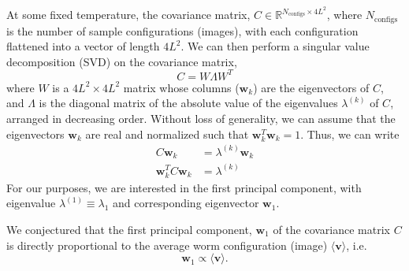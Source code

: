 \documentclass[../main.tex]{subfiles}
\begin{document}
At some fixed temperature, the covariance matrix, $C \in \mathbb{R}^{N_{\mathrm{configs}}\times4L^2}$, where
$N_{\mathrm{configs}}$ is the number of sample configurations (images), with each configuration flattened into a vector
of length $4L^2$. We can then perform a singular value decomposition (SVD) on the covariance matrix,
\begin{equation}
    C = W\Lambda W^{T}
    \label{svd}
\end{equation}
where $W$ is a $4L^2\times 4L^2$ matrix whose columns ($\mathbf{w}_k$) are the eigenvectors of $C$, and $\Lambda$ is
the diagonal matrix of the absolute value of the eigenvalues $\lambda^{(k)}$ of $C$, arranged in decreasing order.
Without loss of generality, we can assume that the eigenvectors $\mathbf{w}_k$ are real and normalized such that
$\mathbf{w}_k^{T} \mathbf{w}_k = 1$. Thus, we can write
\begin{align}
    C \mathbf{w}_k &= \lambda^{(k)} \mathbf{w}_k\\
    \mathbf{w}_k^{T} C \mathbf{w}_k &= \lambda^{(k)}
\end{align}
For our purposes, we are interested in the first principal component, with eigenvalue $\lambda^{(1)} \equiv \lambda_1$
and corresponding eigenvector $\mathbf{w}_1$.

We conjectured that the first principal component, $\mathbf{w}_1$ of the covariance matrix $C$ is directly proportional
to the average worm configuration (image) $\langle \mathbf{v} \rangle$, i.e.
\begin{equation}
    \mathbf{w}_1 \propto \langle \mathbf{v}\rangle.
    \label{conjecture}
\end{equation}
\end{document}
